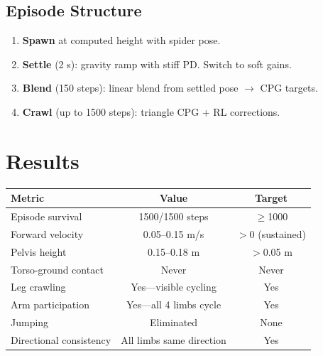 \documentclass[11pt, a4paper]{article}
\begin{document}
\subsection{Episode Structure}

\begin{enumerate}[nosep]
\item \textbf{Spawn} at computed height with spider pose.
\item \textbf{Settle} (2 s): gravity ramp with stiff PD. Switch to soft gains.
\item \textbf{Blend} (150 steps): linear blend from settled pose $\rightarrow$ CPG targets.
\item \textbf{Crawl} (up to 1500 steps): triangle CPG + RL corrections.
\end{enumerate}

\section{Results}

\begin{table}[H]
\centering
\begin{tabular}{lcc}
\toprule
\textbf{Metric} & \textbf{Value} & \textbf{Target} \\
\midrule
Episode survival & 1500/1500 steps & $\geq$1000 \\
Forward velocity & 0.05--0.15 m/s & $>$0 (sustained) \\
Pelvis height & 0.15--0.18 m & $>$0.05 m \\
Torso-ground contact & Never & Never \\
Leg crawling & \textcolor{successgreen}{Yes---visible cycling} & Yes \\
Arm participation & \textcolor{successgreen}{Yes---all 4 limbs cycle} & Yes \\
Jumping & \textcolor{successgreen}{Eliminated} & None \\
Directional consistency & \textcolor{successgreen}{All limbs same direction} & Yes \\
\bottomrule
\end{tabular}
\end{table}

\end{document}
